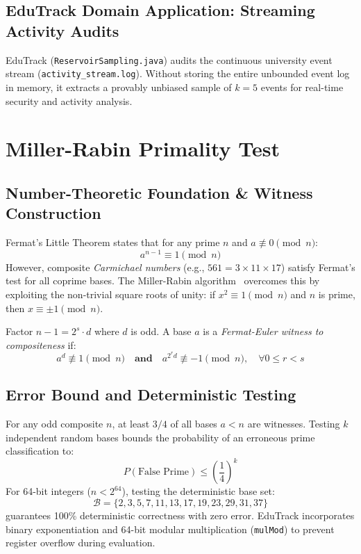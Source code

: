 \subsection{EduTrack Domain Application: Streaming Activity Audits}
EduTrack (\texttt{ReservoirSampling.java}) audits the continuous university event stream (\texttt{activity\_stream.log}). Without storing the entire unbounded event log in memory, it extracts a provably unbiased sample of $k=5$ events for real-time security and activity analysis.

\section{Miller-Rabin Primality Test}
\subsection{Number-Theoretic Foundation \& Witness Construction}
Fermat's Little Theorem states that for any prime $n$ and $a \not\equiv 0 \pmod n$:
\begin{equation}
a^{n-1} \equiv 1 \pmod n
\end{equation}
However, composite \textit{Carmichael numbers} (e.g., $561 = 3 \times 11 \times 17$) satisfy Fermat's test for all coprime bases. The Miller-Rabin algorithm~\cite{millerrabin1980} overcomes this by exploiting the non-trivial square roots of unity: if $x^2 \equiv 1 \pmod n$ and $n$ is prime, then $x \equiv \pm 1 \pmod n$.

Factor $n - 1 = 2^s \cdot d$ where $d$ is odd. A base $a$ is a \textit{Fermat-Euler witness to compositeness} if:
\begin{equation}
a^d \not\equiv 1 \pmod n \quad \textbf{and} \quad a^{2^r d} \not\equiv -1 \pmod n, \quad \forall 0 \le r < s
\end{equation}

\subsection{Error Bound and Deterministic Testing}
For any odd composite $n$, at least $3/4$ of all bases $a < n$ are witnesses. Testing $k$ independent random bases bounds the probability of an erroneous prime classification to:
\begin{equation}
P(\text{False Prime}) \le \left( \frac{1}{4} \right)^k
\end{equation}
For 64-bit integers ($n < 2^{64}$), testing the deterministic base set:
\begin{equation}
\mathcal{B} = \{2, 3, 5, 7, 11, 13, 17, 19, 23, 29, 31, 37\}
\end{equation}
guarantees 100\% deterministic correctness with zero error. EduTrack incorporates binary exponentiation and 64-bit modular multiplication (\texttt{mulMod}) to prevent register overflow during evaluation.

